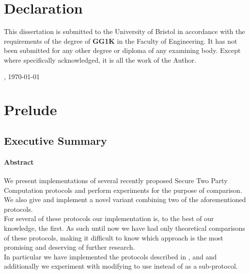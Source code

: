 \documentclass[ %
                    author={Nicholas Tutte},
                supervisor={Prof. Nigel Smart},
                    degree={MEng},
                     title={Secure Two Party Computation},
                  subtitle={A practical comparison of recent protocols},
                      type={Research - GG1K},
                      year={2015} ]{dissertation}
\begin{document}

	\maketitle
	
	\chapter*{Declaration}

		This dissertation is submitted to the University of Bristol in accordance 
		with the requirements of the degree of \textbf{GG1K} in the Faculty 
		of Engineering.  It has not been submitted for any other degree or diploma 
		of any examining body.  Except where specifically acknowledged, it is all 
		the work of the Author. 

		\vspace{6cm}

		, \today


	\chapter*{Prelude}
		\section*{Executive Summary}
			\subsubsection*{Abstract}
			  We present implementations of several recently proposed Secure Two Party Computation protocols and perform experiments for the purpose of comparison. We also give and implement a novel variant combining two of the aforementioned protocols.\\

			  For several of these protocols our implementation is, to the best of our knowledge, the first. As such until now we have had only theoretical comparisons of these protocols, making it difficult to know which approach is the most promising and deserving of further research.\\

			  In particular we have implemented the protocols described in \cite{LindellAndPinkas2011}, \cite{Lindell_CnC_2013} and \cite{Katz_Symm_CnC_2013} and additionally we experiment with modifying \cite{Lindell_CnC_2013} to use \cite{Katz_Symm_CnC_2013} instead of \cite{LindellAndPinkas2011} as a sub-protocol.\\
\end{document}
